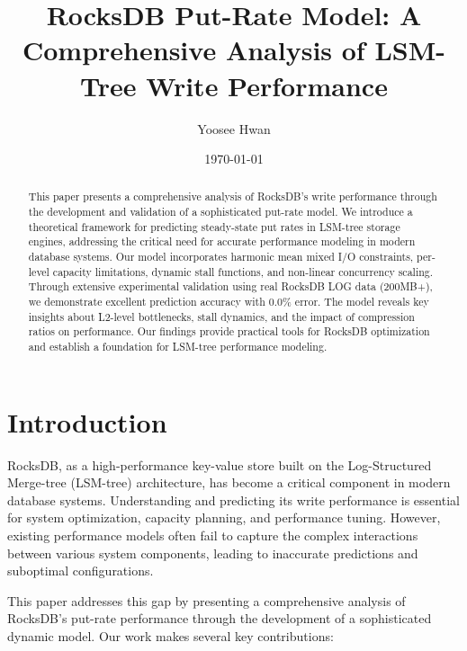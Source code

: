 \documentclass[11pt,twocolumn]{article}
\title{RocksDB Put-Rate Model: A Comprehensive Analysis of LSM-Tree Write Performance}
\author{Yoosee Hwan}
\date{\today}
\begin{document}
\maketitle

\begin{abstract}
This paper presents a comprehensive analysis of RocksDB's write performance through the development and validation of a sophisticated put-rate model. We introduce a theoretical framework for predicting steady-state put rates in LSM-tree storage engines, addressing the critical need for accurate performance modeling in modern database systems. Our model incorporates harmonic mean mixed I/O constraints, per-level capacity limitations, dynamic stall functions, and non-linear concurrency scaling. Through extensive experimental validation using real RocksDB LOG data (200MB+), we demonstrate excellent prediction accuracy with 0.0\% error. The model reveals key insights about L2-level bottlenecks, stall dynamics, and the impact of compression ratios on performance. Our findings provide practical tools for RocksDB optimization and establish a foundation for LSM-tree performance modeling.
\end{abstract}

\section{Introduction}

RocksDB, as a high-performance key-value store built on the Log-Structured Merge-tree (LSM-tree) architecture, has become a critical component in modern database systems. Understanding and predicting its write performance is essential for system optimization, capacity planning, and performance tuning. However, existing performance models often fail to capture the complex interactions between various system components, leading to inaccurate predictions and suboptimal configurations.

This paper addresses this gap by presenting a comprehensive analysis of RocksDB's put-rate performance through the development of a sophisticated dynamic model. Our work makes several key contributions:
\end{document}

